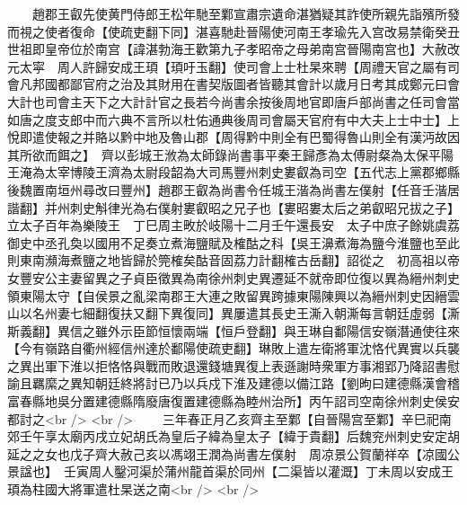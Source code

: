 　　趙郡王叡先使黄門侍郎王松年馳至鄴宣肅宗遺命湛猶疑其詐使所親先詣殯所發而視之使者復命【使疏吏翻下同】湛喜馳赴晉陽使河南王孝瑜先入宫改易禁衛癸丑世祖即皇帝位於南宫【諱湛勃海王歡第九子孝昭帝之母弟南宫晉陽南宫也】大赦改元太寜　周人許歸安成王頊【頊吁玉翻】使司會上士杜杲來聘【周禮天官之屬有司會凡邦國都鄙官府之治及其財用在書契版圖者皆聽其會計以歲月日考其成鄭元曰會大計也司會主天下之大計計官之長若今尚書余按後周地官即唐戶部尚書之任司會當如唐之度支郎中而六典不言所以杜佑通典後周司會屬天官府有中大夫上士中士】上悅即遣使報之并賂以黔中地及魯山郡【周得黔中則全有巴蜀得魯山則全有漢沔故因其所欲而餌之】　齊以彭城王浟為太師錄尚書事平秦王歸彥為太傅尉粲為太保平陽王淹為太宰博陵王濟為太尉段韶為大司馬豐州刺史婁叡為司空【五代志上黨郡鄉縣後魏置南垣州尋改曰豐州】趙郡王叡為尚書令任城王湝為尚書左僕射【任音壬湝居諧翻】并州刺史斛律光為右僕射婁叡昭之兄子也【婁昭婁太后之弟叡昭兄拔之子】立太子百年為樂陵王　丁巳周主畋於岐陽十二月壬午還長安　太子中庶子餘姚虞荔御史中丞孔奐以國用不足奏立煮海鹽賦及榷酤之科【吳王濞煮海為鹽今淮鹽也至此則東南瀕海煮鹽之地皆歸於筦榷矣酤音固荔力計翻榷古岳翻】詔從之　初高祖以帝女豐安公主妻留異之子貞臣徵異為南徐州刺史異遷延不就帝即位復以異為縉州刺史領東陽太守【自侯景之亂梁南郡王大連之敗留異跨據東陽陳興以為縉州刺史因縉雲山以名州妻七細翻復扶又翻下異復同】異屢遣其長史王澌入朝澌每言朝廷虛弱【澌斯義翻】異信之雖外示臣節恒懷兩端【恒戶登翻】與王琳自鄱陽信安嶺潛通使往來【今有嶺路自衢州經信州達於鄱陽使疏吏翻】琳敗上遣左衛將軍沈恪代異實以兵襲之異出軍下淮以拒恪恪與戰而敗退還錢塘異復上表遜謝時衆軍方事湘郢乃降詔書慰諭且羈縻之異知朝廷終將討已乃以兵戍下淮及建德以備江路【劉昫曰建德縣漢會稽富春縣地吳分置建德縣隋廢唐復置建德縣為睦州治所】丙午詔司空南徐州刺史侯安都討之<br />
<br />
　　三年春正月乙亥齊主至鄴【自晉陽宫至鄴】辛巳祀南郊壬午享太廟丙戌立妃胡氏為皇后子緯為皇太子【緯于貴翻】后魏兖州刺史安定胡延之之女也戊子齊大赦己亥以馮翊王潤為尚書左僕射　周凉景公賀蘭祥卒【凉國公景諡也】　壬寅周人鑿河渠於蒲州龍首渠於同州【二渠皆以灌溉】丁未周以安成王頊為柱國大將軍遣杜杲送之南<br />
<br />
